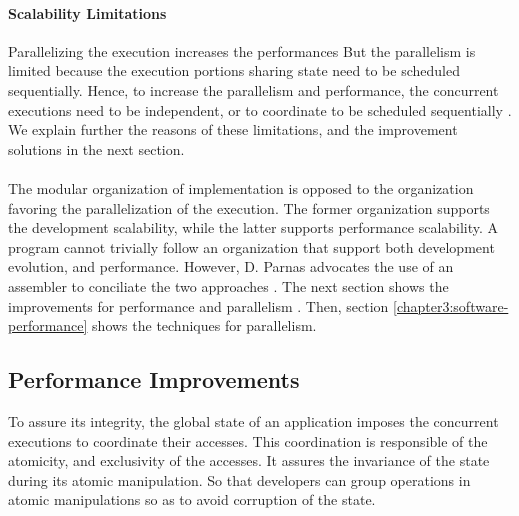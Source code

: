 \paragraph{Scalability Limitations}

Parallelizing the execution increases the performances \cite{Amdahl1967,Gunther1993}
But the parallelism is limited because the execution portions sharing state need to be scheduled sequentially.
Hence, to increase the parallelism and performance, the concurrent executions need to be independent, or to coordinate to be scheduled sequentially \cite{Gustafson1988,Gunther1996,Nelson1996,Gunther2002}.
We explain further the reasons of these limitations, and the improvement solutions in the next section.

\paragraph{}

The modular organization of implementation is opposed to the organization favoring the parallelization of the execution.
The former organization supports the development scalability, while the latter supports performance scalability.
A program cannot trivially follow an organization that support both development evolution, and performance.
However, D. Parnas advocates the use of an assembler to conciliate the two approaches \cite{Parnas1972}.
The next section shows the improvements for performance and parallelism .
Then, section \ref{chapter3:software-performance} shows the techniques for parallelism.

\subsection{Performance Improvements} \label{chapter3:software-maintainability:performance}

To assure its integrity, the global state of an application imposes the concurrent executions to coordinate their accesses.
This coordination is responsible of the atomicity, and exclusivity of the accesses.
It assures the invariance of the state during its atomic manipulation.
So that developers can group operations in atomic manipulations so as to avoid corruption of the state.

